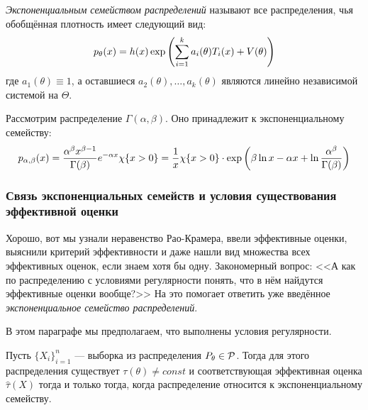 \begin{definition}
	\textit{Экспоненциальным семейством распределений} называют все распределения, чья обобщённая плотность имеет следующий вид:
	\[
		p_\theta(x) = h(x)\exp\left(\sum_{i = 1}^k a_i(\theta)T_i(x) + V(\theta)\right)
	\]
	где $a_1(\theta) \equiv 1$, а оставшиеся $a_2(\theta), \ldots, a_k(\theta)$ являются линейно независимой системой на $\Theta$.
\end{definition}

\begin{example}
	Рассмотрим распределение $\Gamma(\alpha, \beta)$. Оно принадлежит к экспоненциальному семейству:
	\[
		p_{\alpha, \beta}(x) = \frac{\alpha^\beta x^{\beta - 1}}{\Gamma(\beta)} e^{-\alpha x} \chi\{x > 0\} = \frac{1}{x}\chi\{x > 0\} \cdot \exp\left(\beta \ln x - \alpha x + \ln \frac{\alpha^\beta}{\Gamma(\beta)}\right)
	\]
\end{example}

\subsubsection*{Связь экспоненциальных семейств и условия существования эффективной оценки}

\begin{note}
	Хорошо, вот мы узнали неравенство Рао-Крамера, ввели эффективные оценки, выяснили критерий эффективности и даже нашли вид множества всех эффективных оценок, если знаем хотя бы одну. Закономерный вопрос: <<А как по распределению с условиями регулярности понять, что в нём найдутся эффективные оценки вообще?>> На это помогает ответить уже введённое \textit{экспоненциальное семейство распределений}.
\end{note}

\begin{note}
	В этом параграфе мы предполагаем, что выполнены условия регулярности.
\end{note}

\begin{theorem}
	Пусть $\{X_i\}_{i = 1}^n$ --- выборка из распределения $P_\theta \in \mathcal{P}$. Тогда для этого распределения существует $\tau(\theta) \neq const$ и соответствующая эффективная оценка $\hat{\tau}(X)$ тогда и только тогда, когда распределение относится к экспоненциальному семейству.
\end{theorem}

